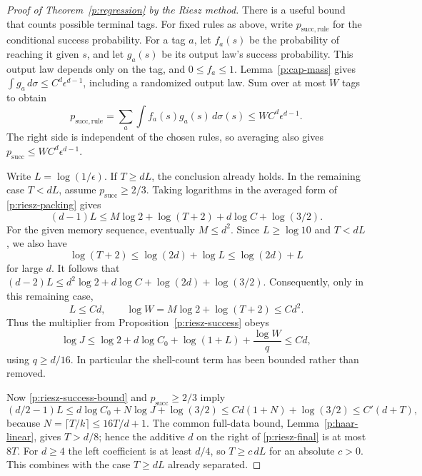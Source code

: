 \begin{proof}[Proof of Theorem~\ref{p:regression} by the Riesz method]
There is a useful bound that counts possible terminal tags.
For fixed rules as above, write $p_{\mathrm{succ},\mathrm{rule}}$ for
the conditional success probability.
For a tag $a$, let $f_a(s)$ be the probability of reaching it
given $s$, and let $g_a(s)$ be its output law's success
probability.  This output law depends only on the tag, and
$0\le f_a\le1$.
Lemma~\ref{p:cap-mass} gives
$\int g_a\,d\sigma\le C^d\epsilon^{d-1}$, including a randomized
output law.  Sum over at most $W$ tags to obtain
\begin{equation}\label{p:riesz-packing}
 p_{\mathrm{succ},\mathrm{rule}}=\sum_a\int f_a(s)g_a(s)\,d\sigma(s)
 \le W C^d\epsilon^{d-1}.
\end{equation}
The right side is independent of the chosen rules, so averaging
also gives $p_{\mathrm{succ}}\le W C^d\epsilon^{d-1}$.

Write $L=\log(1/\epsilon)$.  If $T\ge dL$, the conclusion
already holds.  In the remaining case $T<dL$, assume $p_{\mathrm{succ}}\ge2/3$.
Taking logarithms in the averaged form of \eqref{p:riesz-packing} gives
\[
 (d-1)L
 \le M\log2+\log(T+2)+d\log C+\log(3/2).
\]
For the given memory sequence, eventually $M\le d^2$.  Since
$L\ge\log10$ and $T<dL$, we also have
\[
 \log(T+2)\le\log(2d)+\log L\le\log(2d)+L
\]
for large $d$.  It follows that
$(d-2)L\le d^2\log2+d\log C+\log(2d)+\log(3/2)$.
Consequently, only in this remaining case,
\begin{equation}\label{p:riesz-short-run}
 L\le Cd,\qquad \log W=M\log2+\log(T+2)\le Cd^2 .
\end{equation}
Thus the multiplier from Proposition~\ref{p:riesz-success} obeys
\[
 \log J
 \le \log2+d\log C_0+\log(1+L)+\frac{\log W}{q}
 \le Cd ,
\]
using $q\ge d/16$.  In particular the shell-count term has
been bounded rather than removed.

Now \eqref{p:riesz-success-bound} and $p_{\mathrm{succ}}\ge2/3$ imply
\begin{equation}\label{p:riesz-final}
 (d/2-1)L
 \le d\log C_0+N\log J+\log(3/2)
 \le Cd(1+N)+\log(3/2)
 \le C'(d+T),
\end{equation}
because $N=\lceil T/k\rceil\le16T/d+1$.
The common full-data bound, Lemma~\ref{p:haar-linear}, gives
$T>d/8$; hence the additive $d$ on the right of
\eqref{p:riesz-final} is at most $8T$.
For $d\ge4$ the left coefficient is at least $d/4$, so
$T\ge c\,dL$ for an absolute $c>0$. This combines with the
case $T\ge dL$ already separated.
\end{proof}
